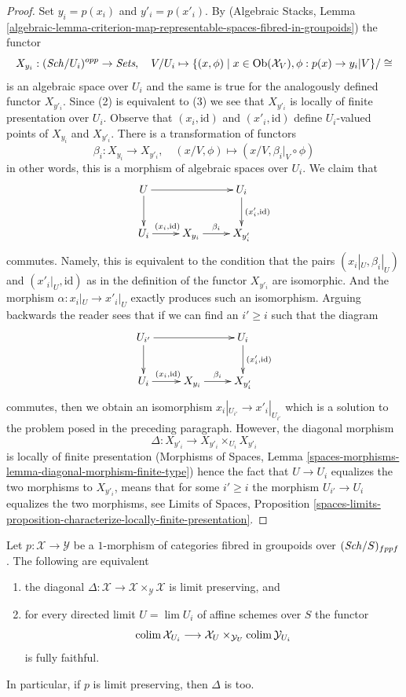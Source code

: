 \begin{proof}
\medskip\noindent
Set $y_i = p(x_i)$ and $y'_i = p(x'_i)$.
By (Algebraic Stacks, Lemma
\ref{algebraic-lemma-criterion-map-representable-spaces-fibred-in-groupoids})
the functor
$$
X_{y_i} : (\mathit{Sch}/U_i)^{opp} \to \textit{Sets},\quad
V/U_i \mapsto
\{(x, \phi) \mid x \in \mathop{\mathrm{Ob}}\nolimits(\mathcal{X}_V), \phi : p(x) \to y_i|V\}/\cong
$$
is an algebraic space over $U_i$ and the same is true for the
analogously defined functor $X_{y'_i}$. Since (2) is equivalent to (3)
we see that $X_{y'_i}$ is locally of finite presentation over $U_i$.
Observe that $(x_i, \text{id})$ and $(x'_i, \text{id})$ define
$U_i$-valued points of $X_{y_i}$ and $X_{y'_i}$.
There is a transformation of functors
$$
\beta_i : X_{y_i} \to X_{y'_i},\quad
(x/V, \phi) \mapsto (x/V, \beta_i|_V \circ \phi)
$$
in other words, this is a morphism of algebraic spaces over $U_i$.
We claim that
$$
\xymatrix{
U \ar[d] \ar[rr] & & U_i \ar[d]^{(x'_i, \text{id})} \\
U_i \ar[r]^{(x_i, \text{id})} & X_{y_i} \ar[r]^{\beta_i} & X_{y'_i}
}
$$
commutes. Namely, this is equivalent to the condition that
the pairs $(x_i|_U, \beta_i|_U)$ and $(x'_i|_U, \text{id})$
as in the definition of the functor $X_{y'_i}$ are isomorphic.
And the morphism $\alpha : x_i|_U \to x'_i|_U$ exactly produces
such an isomorphism. Arguing backwards the reader sees that
if we can find an $i' \geq i$ such that the diagram
$$
\xymatrix{
U_{i'} \ar[d] \ar[rr] & & U_i \ar[d]^{(x'_i, \text{id})} \\
U_i \ar[r]^{(x_i, \text{id})} & X_{y_i} \ar[r]^{\beta_i} & X_{y'_i}
}
$$
commutes, then we obtain an isomorphism $x_i|_{U_{i'}} \to x'_i|_{U_{i'}}$
which is a solution to the problem posed in the preceding paragraph.
However, the diagonal morphism
$$
\Delta : X_{y'_i} \to X_{y'_i} \times_{U_i} X_{y'_i}
$$
is locally of finite presentation (Morphisms of Spaces, Lemma
\ref{spaces-morphisms-lemma-diagonal-morphism-finite-type})
hence the fact that $U \to U_i$ equalizes the two morphisms to $X_{y'_i}$,
means that for some $i' \geq i$ the morphism $U_{i'} \to U_i$
equalizes the two morphisms, see
Limits of Spaces, Proposition
\ref{spaces-limits-proposition-characterize-locally-finite-presentation}.
\end{proof}

\begin{lemma}
\label{lemma-limit-preserving-diagonal}
Let $p : \mathcal{X} \to \mathcal{Y}$ be a $1$-morphism of categories
fibred in groupoids over $(\mathit{Sch}/S)_{fppf}$. The following are equivalent
\begin{enumerate}
\item the diagonal
$\Delta : \mathcal{X} \to \mathcal{X} \times_\mathcal{Y} \mathcal{X}$
is limit preserving, and
\item for every directed limit $U = \lim U_i$ of affine schemes over $S$
the functor
$$
\mathop{\mathrm{colim}}\nolimits \mathcal{X}_{U_i} \longrightarrow
\mathcal{X}_U \times_{\mathcal{Y}_U} \mathop{\mathrm{colim}}\nolimits \mathcal{Y}_{U_i}
$$
is fully faithful.
\end{enumerate}
In particular, if $p$ is limit preserving, then $\Delta$ is too.
\end{lemma}

